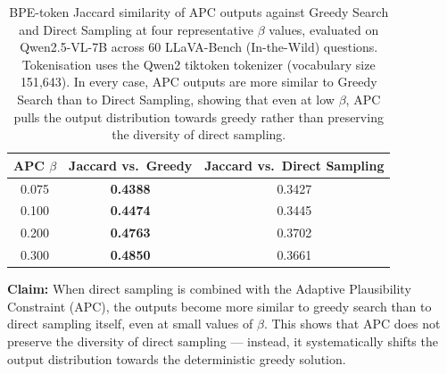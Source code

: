 \documentclass[11pt]{article}
\begin{document}
\begin{table}[ht]
\centering
\caption{BPE-token Jaccard similarity of APC outputs against Greedy Search and Direct
Sampling at four representative $\beta$ values, evaluated on Qwen2.5-VL-7B across 60
LLaVA-Bench (In-the-Wild) questions. Tokenisation uses the Qwen2 tiktoken tokenizer
(vocabulary size 151{,}643). In every case, APC outputs are more similar to Greedy Search
than to Direct Sampling, showing that even at low $\beta$, APC pulls the output distribution
towards greedy rather than preserving the diversity of direct sampling.}
\label{tab:qwen_jaccard_apc_greedy_vs_sample}

\setlength{\tabcolsep}{12pt}
\renewcommand{\arraystretch}{1.2}

\begin{tabular}{ccc}
\toprule
\textbf{APC $\beta$}
  & \textbf{Jaccard vs.\ Greedy}
  & \textbf{Jaccard vs.\ Direct Sampling} \\
\midrule
0.075 & \textbf{0.4388} & 0.3427 \\
0.100 & \textbf{0.4474} & 0.3445 \\
0.200 & \textbf{0.4763} & 0.3702 \\
0.300 & \textbf{0.4850} & 0.3661 \\
\bottomrule
\end{tabular}

\medskip
\noindent
\textbf{Claim:} When direct sampling is combined with the Adaptive Plausibility Constraint
(APC), the outputs become more similar to greedy search than to direct sampling itself,
even at small values of $\beta$. This shows that APC does not preserve the diversity of
direct sampling --- instead, it systematically shifts the output distribution towards the
deterministic greedy solution.

\end{table}

\bigskip
\end{document}
